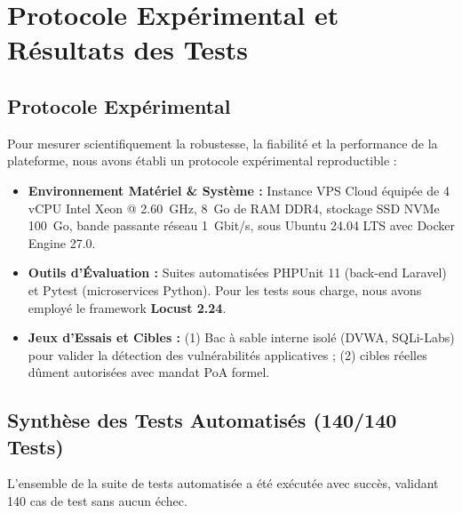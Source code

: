 \section{Protocole Exp\'erimental et R\'esultats des Tests}
\subsection{Protocole Exp\'erimental}
\par Pour mesurer scientifiquement la robustesse, la fiabilit\'e et la performance de la plateforme, nous avons \'etabli un protocole exp\'erimental reproductible :
\begin{itemize}
    \item \textbf{Environnement Mat\'eriel \& Syst\`eme :} Instance VPS Cloud \'equip\'ee de 4 vCPU Intel Xeon @ 2.60~GHz, 8~Go de RAM DDR4, stockage SSD NVMe 100~Go, bande passante r\'eseau 1~Gbit/s, sous Ubuntu 24.04 LTS avec Docker Engine 27.0.
    \item \textbf{Outils d'\'Evaluation :} Suites automatis\'ees PHPUnit 11 (back-end Laravel) et Pytest (microservices Python). Pour les tests sous charge, nous avons employ\'e le framework \textbf{Locust 2.24}.
    \item \textbf{Jeux d'Essais et Cibles :} (1) Bac \`a sable interne isol\'e (DVWA, SQLi-Labs) pour valider la d\'etection des vuln\'erabilit\'es applicatives ; (2) cibles r\'eelles d\^ument autoris\'ees avec mandat PoA formel.
\end{itemize}

\subsection{Synth\`ese des Tests Automatis\'es (140/140 Tests)}
\par L'ensemble de la suite de tests automatis\'ee a \'et\'e ex\'ecut\'ee avec succ\`es, validant 140 cas de test sans aucun \'echec.

